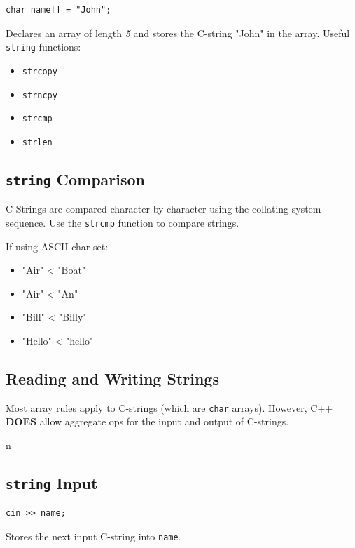 \documentclass{article}
\begin{document}
\begin{lstlisting}[caption={Omitting Size of Array During Initialization}]
  char name[] = "John";
\end{lstlisting}

Declares an array of length \textit{5} and stores the C-string "John" in the
array. Useful \texttt{string} functions:

\begin{itemize}
  \item \texttt{strcopy}
  \item \texttt{strncpy}
  \item \texttt{strcmp}
  \item \texttt{strlen}
\end{itemize}

\subsection{\texttt{string} Comparison}
C-Strings are compared character by character using the collating system
sequence. Use the \texttt{strcmp} function to compare strings.

\vspace{8pt}

If using ASCII char set:
\begin{itemize}
  \item "Air" \textless{} "Boat"
  \item "Air" \textless{} "An"
  \item "Bill" \textless{} "Billy"
  \item "Hello" \textless{} "hello"
\end{itemize}

\subsection{Reading and Writing Strings}
Most array rules apply to C-strings (which are \texttt{char} arrays). However,
C++ \textbf{DOES} allow aggregate ops for the input and output of C-strings.


n\subsection{\texttt{string} Input}
\begin{lstlisting}[caption={String Input Example}]
  cin >> name;
\end{lstlisting}

Stores the next input C-string into \texttt{name}.
\end{document}

